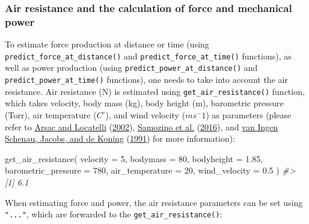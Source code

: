 \documentclass[fleqn,10pt]{wlpeerj} %
\newenvironment{Shaded}{\begin{snugshade}}{\end{snugshade}}
\newcommand{\AttributeTok}[1]{\textcolor[rgb]{0.77,0.63,0.00}{#1}}
\newcommand{\CommentTok}[1]{\textcolor[rgb]{0.56,0.35,0.01}{\textit{#1}}}
\newcommand{\DecValTok}[1]{\textcolor[rgb]{0.00,0.00,0.81}{#1}}
\newcommand{\FloatTok}[1]{\textcolor[rgb]{0.00,0.00,0.81}{#1}}
\newcommand{\FunctionTok}[1]{\textcolor[rgb]{0.00,0.00,0.00}{#1}}
\newcommand{\NormalTok}[1]{#1}
\begin{document}
\normalsize

\hypertarget{air-resistance-and-the-calculation-of-force-and-mechanical-power}{%
\subsubsection{Air resistance and the calculation of force and mechanical power}\label{air-resistance-and-the-calculation-of-force-and-mechanical-power}}

To estimate force production at distance or time (using \texttt{predict\_force\_at\_distance()} and \texttt{predict\_force\_at\_time()} functions), as well as power production (using \texttt{predict\_power\_at\_distance()} and \texttt{predict\_power\_at\_time()} functions), one needs to take into account the air resistance. Air resistance (N) is estimated using \texttt{get\_air\_resistance()} function, which takes velocity, body mass (kg), body height (m), barometric pressure (Torr), air temperature (\(C^\circ\)), and wind velocity (\(ms^-1\)) as parameters (please refer to \protect\hyperlink{ref-arsacModelingEnergetics100m2002}{Arsac and Locatelli} (\protect\hyperlink{ref-arsacModelingEnergetics100m2002}{2002}), \protect\hyperlink{ref-samozinoSimpleMethodMeasuring2016}{Samozino et al.} (\protect\hyperlink{ref-samozinoSimpleMethodMeasuring2016}{2016}), and \protect\hyperlink{ref-vaningenschenauCanCyclePower1991}{van Ingen Schenau, Jacobs, and de Koning} (\protect\hyperlink{ref-vaningenschenauCanCyclePower1991}{1991}) for more information):

\small

\begin{Shaded}
\begin{Highlighting}[]
\FunctionTok{get\_air\_resistance}\NormalTok{(}
  \AttributeTok{velocity =} \DecValTok{5}\NormalTok{,}
  \AttributeTok{bodymass =} \DecValTok{80}\NormalTok{,}
  \AttributeTok{bodyheight =} \FloatTok{1.85}\NormalTok{,}
  \AttributeTok{barometric\_pressure =} \DecValTok{780}\NormalTok{,}
  \AttributeTok{air\_temperature =} \DecValTok{20}\NormalTok{,}
  \AttributeTok{wind\_velocity =} \FloatTok{0.5}
\NormalTok{)}
\CommentTok{\#\textgreater{} [1] 6.1}
\end{Highlighting}
\end{Shaded}

\normalsize

When estimating force and power, the air resistance parameters can be set using \texttt{"..."}, which are forwarded to the \texttt{get\_air\_resistance()}:
\end{document}
